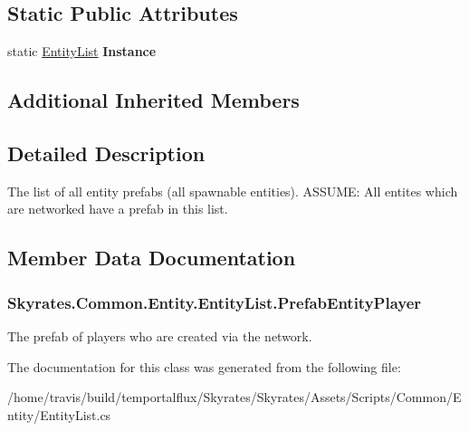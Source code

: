 \subsection*{Static Public Attributes}
\begin{DoxyCompactItemize}
\item 
\hypertarget{class_skyrates_1_1_common_1_1_entity_1_1_entity_list_a245112cf29f342bcb8fc4c44b560502c}{static \hyperlink{class_skyrates_1_1_common_1_1_entity_1_1_entity_list}{Entity\-List} {\bfseries Instance}}\label{class_skyrates_1_1_common_1_1_entity_1_1_entity_list_a245112cf29f342bcb8fc4c44b560502c}

\end{DoxyCompactItemize}
\subsection*{Additional Inherited Members}


\subsection{Detailed Description}
The list of all entity prefabs (all spawnable entities). A\-S\-S\-U\-M\-E\-: All entites which are networked have a prefab in this list. 



\subsection{Member Data Documentation}
\hypertarget{class_skyrates_1_1_common_1_1_entity_1_1_entity_list_acd5f04c525f76e64706d7964bcbfceba}{
\subsubsection[{Prefab\-Entity\-Player}]{ Skyrates.\-Common.\-Entity.\-Entity\-List.\-Prefab\-Entity\-Player}}\label{class_skyrates_1_1_common_1_1_entity_1_1_entity_list_acd5f04c525f76e64706d7964bcbfceba}


The prefab of players who are created via the network. 



The documentation for this class was generated from the following file\-:\begin{DoxyCompactItemize}
\item 
/home/travis/build/temportalflux/\-Skyrates/\-Skyrates/\-Assets/\-Scripts/\-Common/\-Entity/Entity\-List.\-cs\end{DoxyCompactItemize}
